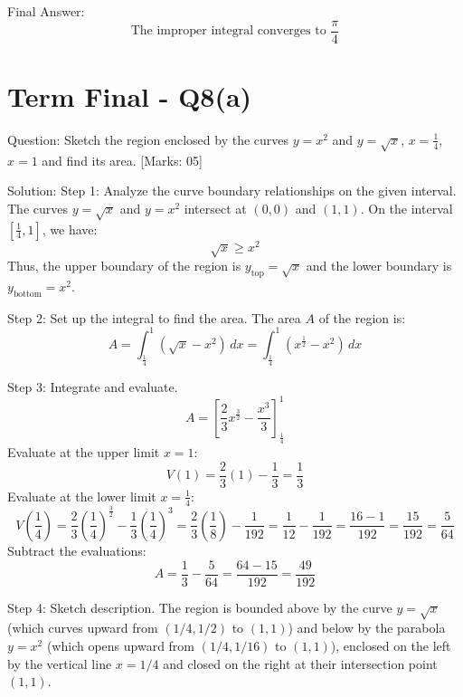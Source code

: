 \documentclass[11pt, a4paper]{article}
\begin{document}
Final Answer:
\[
\boxed{\text{The improper integral converges to } \frac{\pi}{4}}
\]





\section*{Term Final - Q8(a)}

Question:
Sketch the region enclosed by the curves $y = x^2$ and $y = \sqrt{x}$, $x = \frac{1}{4}$, $x = 1$ and find its area. [Marks: 05]

Solution:
Step 1: Analyze the curve boundary relationships on the given interval.
The curves $y = \sqrt{x}$ and $y = x^2$ intersect at $(0, 0)$ and $(1, 1)$.
On the interval $[\frac{1}{4}, 1]$, we have:
\[
\sqrt{x} \ge x^2
\]
Thus, the upper boundary of the region is $y_{\text{top}} = \sqrt{x}$ and the lower boundary is $y_{\text{bottom}} = x^2$.

Step 2: Set up the integral to find the area.
The area $A$ of the region is:
\[
A = \int_{\frac{1}{4}}^{1} \left( \sqrt{x} - x^2 \right) \, dx = \int_{\frac{1}{4}}^{1} \left( x^{\frac{1}{2}} - x^2 \right) \, dx
\]

Step 3: Integrate and evaluate.
\[
A = \left[ \frac{2}{3} x^{\frac{3}{2}} - \frac{x^3}{3} \right]_{\frac{1}{4}}^{1}
\]
Evaluate at the upper limit $x = 1$:
\[
V(1) = \frac{2}{3}(1) - \frac{1}{3} = \frac{1}{3}
\]
Evaluate at the lower limit $x = \frac{1}{4}$:
\[
V\left(\frac{1}{4}\right) = \frac{2}{3}\left(\frac{1}{4}\right)^{\frac{3}{2}} - \frac{1}{3}\left(\frac{1}{4}\right)^3 = \frac{2}{3}\left(\frac{1}{8}\right) - \frac{1}{192} = \frac{1}{12} - \frac{1}{192} = \frac{16 - 1}{192} = \frac{15}{192} = \frac{5}{64}
\]
Subtract the evaluations:
\[
A = \frac{1}{3} - \frac{5}{64} = \frac{64 - 15}{192} = \frac{49}{192}
\]

Step 4: Sketch description.
The region is bounded above by the curve $y = \sqrt{x}$ (which curves upward from $(1/4, 1/2)$ to $(1,1)$) and below by the parabola $y = x^2$ (which opens upward from $(1/4, 1/16)$ to $(1,1)$), enclosed on the left by the vertical line $x = 1/4$ and closed on the right at their intersection point $(1,1)$.
\end{document}
